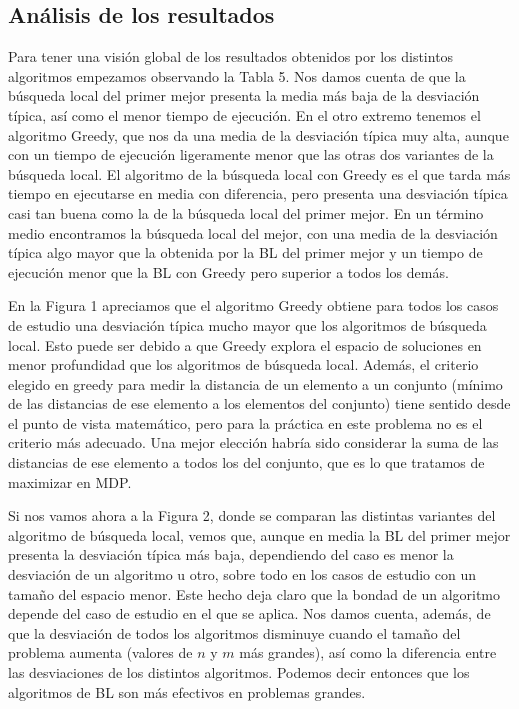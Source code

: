 \documentclass[11pt,a4paper]{article}
\begin{document}
	\subsection{ Análisis de los resultados }
	
	Para tener una visión global de los resultados obtenidos por los distintos algoritmos empezamos observando la Tabla 5. Nos damos cuenta de que la búsqueda local del primer mejor presenta la media más baja de la desviación típica, así como el menor tiempo de ejecución. En el otro extremo tenemos el algoritmo Greedy, que nos da una media de la desviación típica muy alta, aunque con un tiempo de ejecución ligeramente menor que las otras dos variantes de la búsqueda local. El algoritmo de la búsqueda local con Greedy es el que tarda más tiempo en ejecutarse en media con diferencia, pero presenta una desviación típica casi tan buena como la de la búsqueda local del primer mejor. En un término medio encontramos la búsqueda local del mejor, con una media de la desviación típica algo mayor que la obtenida por la BL del primer mejor y un tiempo de ejecución menor que la BL con Greedy pero superior a todos los demás. 
	
	En la Figura 1 apreciamos que el algoritmo Greedy obtiene para todos los casos de estudio una desviación típica mucho mayor que los algoritmos de búsqueda local. Esto puede ser debido a que Greedy explora el espacio de soluciones en menor profundidad que los algoritmos de búsqueda local. Además, el criterio elegido en greedy para medir la distancia de un elemento a un conjunto (mínimo de las distancias de ese elemento a los elementos del conjunto) tiene sentido desde el punto de vista matemático, pero para la práctica en este problema no es el criterio más adecuado. Una mejor elección habría sido considerar la suma de las distancias de ese elemento a todos los del conjunto, que es lo que tratamos de maximizar en MDP. 
	
	 Si nos vamos ahora a la Figura 2, donde se comparan las distintas variantes del algoritmo de búsqueda local, vemos que, aunque en media la BL del primer mejor presenta la desviación típica más baja, dependiendo del caso es menor la desviación de un algoritmo u otro, sobre todo en los casos de estudio con un tamaño del espacio menor. Este hecho deja claro que la bondad de un algoritmo depende del caso de estudio en el que se aplica. Nos damos cuenta, además, de que la desviación de todos los algoritmos disminuye cuando el tamaño del problema aumenta (valores de $n$ y $m$ más grandes), así como la diferencia entre las desviaciones de los distintos algoritmos. Podemos decir entonces que los algoritmos de BL son más efectivos en problemas grandes. 
	 
\end{document}
